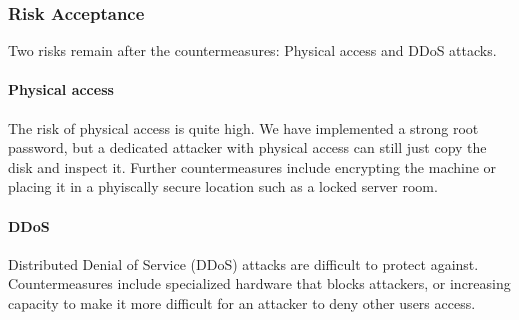 \documentclass{article}
\begin{document}
\subsubsection{Risk Acceptance}

Two risks remain after the countermeasures: Physical access and DDoS attacks. 

\paragraph{Physical access}
The risk of physical access is quite high. 
We have implemented a strong root password, but a dedicated attacker with physical access can still just copy the disk and inspect it. 
Further countermeasures include encrypting the machine or placing it in a phyiscally secure location such as a locked server room. 

\paragraph{DDoS}
Distributed Denial of Service (DDoS) attacks are difficult to protect against.
Countermeasures include specialized hardware that blocks attackers, 
or increasing capacity to make it more difficult for an attacker to deny other users access.
\end{document}
